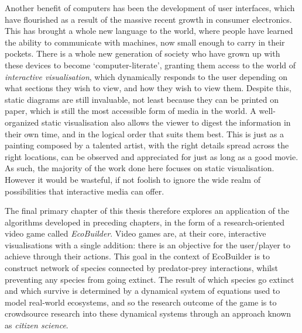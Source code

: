 Another benefit of computers has been the development of user interfaces, which have flourished as a result of the massive recent growth in consumer electronics. This has brought a whole new language to the world, where people have learned the ability to communicate with machines, now small enough to carry in their pockets. There is a whole new generation of society who have grown up with these devices to become `computer-literate', granting them access to the world of \emph{interactive visualisation}, which dynamically responds to the user depending on what sections they wish to view, and how they wish to view them.
Despite this, static diagrams are still invaluable, not least because they can be printed on paper, which is still the most accessible form of media in the world. A well-organized static visualisation also allows the viewer to digest the information in their own time, and in the logical order that suits them best. This is just as a painting composed by a talented artist, with the right details spread across the right locations, can be observed and appreciated for just as long as a good movie.
As such, the majority of the work done here focuses on static visualisation. However it would be wasteful, if not foolish to ignore the wide realm of possibilities that interactive media can offer.

The final primary chapter of this thesis therefore explores an application of the algorithms developed in preceding chapters, in the form of a research-oriented video game called \emph{EcoBuilder}. Video games are, at their core, interactive visualisations with a single addition: there is an objective for the user/player to achieve through their actions. This goal in the context of EcoBuilder is to construct network of species connected by predator-prey interactions, whilst preventing any species from going extinct. The result of which species go extinct and which survive is determined by a dynamical system of equations used to model real-world ecosystems, and so the research outcome of the game is to crowdsource research into these dynamical systems through an approach known as \emph{citizen science}.

